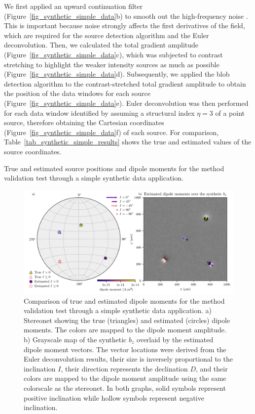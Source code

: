 We first applied an upward continuation filter (Figure~\ref{fig_synthetic_simple_data}b) to smooth out the high-frequency noise \citep{Blakely1996}.
This is important because noise strongly affects the first derivatives of the field, which are required for the source detection algorithm and the Euler deconvolution.
Then, we calculated the total gradient amplitude (Figure~\ref{fig_synthetic_simple_data}c), which was subjected to contrast stretching to highlight the weaker intensity sources as much as possible (Figure~\ref{fig_synthetic_simple_data}d).
Subsequently, we applied the blob detection algorithm to the contrast-stretched total gradient amplitude to obtain the position of the data windows for each source (Figure~\ref{fig_synthetic_simple_data}e).
Euler deconvolution was then performed for each data window identified by assuming a structural index $\eta = 3$ of a point source, therefore obtaining the Cartesian coordinates (Figure~\ref{fig_synthetic_simple_data}f) of each source. For comparison, Table~\ref{tab_synthetic_simple_results} shows the true and estimated values of the source coordinates.

\begin{table}[tb!]
  \begin{center}
    \small
    
  \end{center}
  \caption{
    True and estimated source positions and dipole moments for the method validation test through a simple synthetic data application.
  }
  \label{tab_synthetic_simple_results}
\end{table}

\begin{figure}[tb!]
  \centering
  \includegraphics[width=\linewidth]{figures/simple-synthetic-dipole-moment.png}
  \caption{
    Comparison of true and estimated dipole moments for the method validation test through a simple synthetic data application.
    a) Stereonet showing the true (triangles) and estimated (circles) dipole moments. 
    The colors are mapped to the dipole moment amplitude.
    b) Grayscale map of the synthetic $b_z$ overlaid by the estimated dipole moment vectors.
    The vector locations were derived from the Euler deconvolution results, their size is inversely proportional to the inclination $I$, their direction represents the declination $D$, and their colors are mapped to the dipole moment amplitude using the same colorscale as the stereonet.
    In both graphs, solid symbols represent positive inclination while hollow symbols represent negative inclination.
  }
  \label{fig_synthetic_simple_results}
\end{figure}

